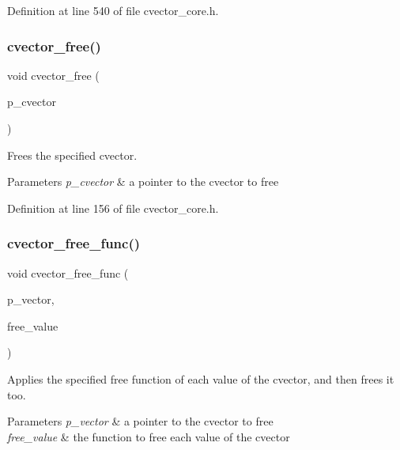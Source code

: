 Definition at line 540 of file cvector\+\_\+core.\+h.

\mbox{\label{cvector__interface_8h_a91b4f946caa0193dceb9afec7f54e7ff}} 
\subsubsection{cvector\+\_\+free()}
{\footnotesize\ttfamily void cvector\+\_\+free (\begin{DoxyParamCaption}\item[{\textbf{ cvector} $\ast$}]{p\+\_\+cvector }\end{DoxyParamCaption})}

Frees the specified cvector. 
\begin{DoxyParams}{Parameters}
{\em p\+\_\+cvector} & a pointer to the cvector to free \\
\hline
\end{DoxyParams}


Definition at line 156 of file cvector\+\_\+core.\+h.

\mbox{\label{cvector__interface_8h_a7ce27dde556f0de76df7c34a48e517a9}} 
\subsubsection{cvector\+\_\+free\+\_\+func()}
{\footnotesize\ttfamily void cvector\+\_\+free\+\_\+func (\begin{DoxyParamCaption}\item[{\textbf{ cvector} $\ast$}]{p\+\_\+vector,  }\item[{void($\ast$)(\textbf{ value\+\_\+t})}]{free\+\_\+value }\end{DoxyParamCaption})}

Applies the specified free function of each value of the cvector, and then frees it too. 
\begin{DoxyParams}{Parameters}
{\em p\+\_\+vector} & a pointer to the cvector to free \\
\hline
{\em free\+\_\+value} & the function to free each value of the cvector \\
\hline
\end{DoxyParams}


